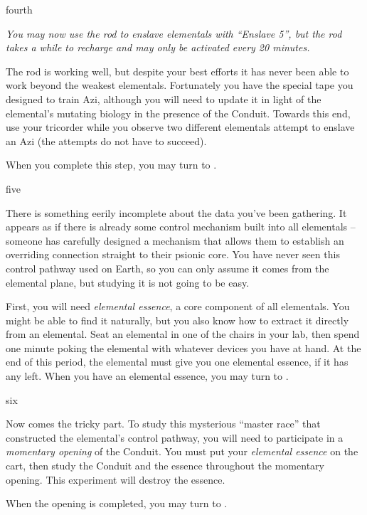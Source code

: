 \documentclass[notebook]{elementals}
\begin{document}
\begin{page}{fourth}

\emph{You may now use the rod to enslave elementals with ``Enslave 5'', but the rod takes a while to recharge and may only be activated every 20 minutes.}

The rod is working well, but despite your best efforts it has never been able to work beyond the weakest elementals. Fortunately you have the special tape you designed to train Azi, although you will need to update it in light of the elemental's mutating biology in the presence of the Conduit. Towards this end, use your tricorder while you observe two different elementals attempt to enslave an Azi (the attempts do not have to succeed).

When you complete this step, you may turn to .

\end{page}

\begin{page}{five}

There is something eerily incomplete about the data you've been gathering. It appears as if there is already some control mechanism built into all elementals -- someone has carefully designed a mechanism that allows them to establish an overriding connection straight to their psionic core. You have never seen this control pathway used on Earth, so you can only assume it comes from the elemental plane, but studying it is not going to be easy.

First, you will need \emph{elemental essence}, a core component of all elementals. You might be able to find it naturally, but you also know how to extract it directly from an elemental. Seat an elemental in one of the chairs in your lab, then spend one minute poking the elemental with whatever devices you have at hand. At the end of this period, the elemental must give you one elemental essence, if it has any left. When you have an elemental essence, you may turn to .

\end{page}

\begin{page}{six}

Now comes the tricky part. To study this mysterious ``master race'' that constructed the elemental's control pathway, you will need to participate in a \emph{momentary opening} of the Conduit. You must put your \emph{elemental essence} on the cart, then study the Conduit and the essence throughout the momentary opening. This experiment will destroy the essence.

When the opening is completed, you may turn to .

\end{page}
\end{document}
